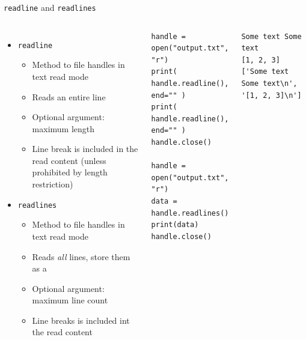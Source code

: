 \begin{frame}[fragile]{\texttt{readline} and \texttt{readlines}}
%
\begin{columns}[T]
\begin{itemize}
\item \texttt{readline}
	\begin{itemize}
	\item Method to file handles in text read mode
	\item Reads an entire line
	\item Optional argument: maximum length
	\item Line break is included in the read content (unless prohibited by length restriction)
	\end{itemize}
\item \texttt{readlines}
	\begin{itemize}
	\item Method to file handles in text read mode
	\item Reads \emph{all} lines, store them as a 
	\item Optional argument: maximum line count
	\item Line breaks is included int the read content
	\end{itemize}
\end{itemize}
%
\begin{codebox}
\begin{verbatim}
handle = open("output.txt", "r")
print( handle.readline(), end="" )
print( handle.readline(), end="" )
handle.close()

handle = open("output.txt", "r")
data = handle.readlines()
print(data)
handle.close()
\end{verbatim}
\end{codebox}
%
\begin{cmdbox}
\begin{verbatim}
Some text Some text
[1, 2, 3]
['Some text Some text\n', '[1, 2, 3]\n']
\end{verbatim}
\end{cmdbox}
%
\end{columns}
%
\end{frame}



